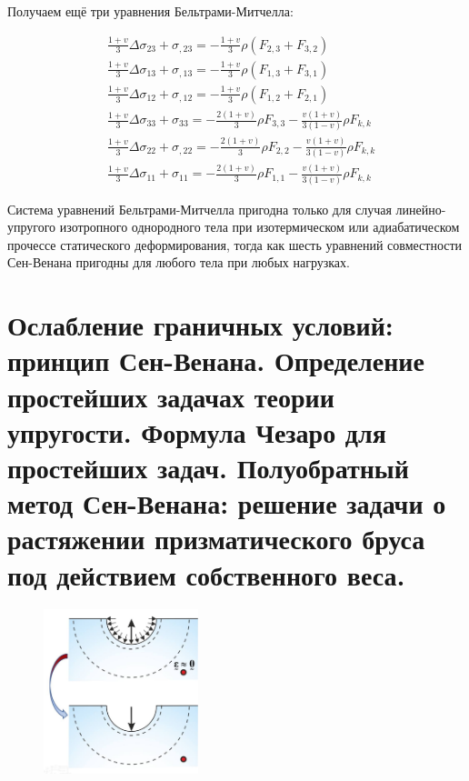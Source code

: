 Получаем ещё три уравнения Бельтрами-Митчелла:

$$
\begin{aligned}
& \frac{1+v}{3} \Delta \sigma_{23}+\sigma_{, 23}=-\frac{1+v}{3} \rho\left(F_{2,3}+F_{3,2}\right) \\
& \frac{1+v}{3} \Delta \sigma_{13}+\sigma_{, 13}=-\frac{1+v}{3} \rho\left(F_{1,3}+F_{3,1}\right) \\
& \frac{1+v}{3} \Delta \sigma_{12}+\sigma_{, 12}=-\frac{1+v}{3} \rho\left(F_{1,2}+F_{2,1}\right) \\
& \frac{1+v}{3} \Delta \sigma_{33}+\sigma_{33}=-\frac{2(1+v)}{3} \rho F_{3,3}-\frac{v(1+v)}{3(1-v)} \rho F_{k, k} \\
& \frac{1+v}{3} \Delta \sigma_{22}+\sigma_{, 22}=-\frac{2(1+v)}{3} \rho F_{2,2}-\frac{v(1+v)}{3(1-v)} \rho F_{k, k} \\
& \frac{1+v}{3} \Delta \sigma_{11}+\sigma_{11}=-\frac{2(1+v)}{3} \rho F_{1,1}-\frac{v(1+v)}{3(1-v)} \rho F_{k, k}
\end{aligned}
$$


 Система уравнений Бельтрами-Митчелла пригодна только для случая линейно-упругого изотропного однородного тела при изотермическом или адиабатическом прочессе статического деформирования, тогда как шесть уравнений совместности Сен-Венана пригодны для любого тела при любых нагрузках.


\section{Ослабление граничных условий: принцип Сен-Венана. Определение простейших задачах теории упругости. Формула Чезаро для простейших задач. Полуобратный метод Сен-Венана: решение задачи о растяжении призматического бруса под действием собственного веса.}

\begin{figure}[h!]
  \centering
  \includegraphics[width=0.4\textwidth]{images/14.1.jpg}
\end{figure}

